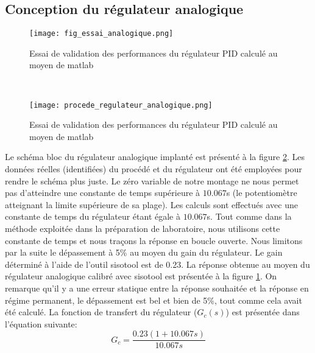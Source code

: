 \subsection{Conception du régulateur  analogique}
\begin{figure}[htb]
\centering
\texttt{[image: fig\_essai\_analogique.png]}
\caption{Essai de validation des performances du régulateur PID calculé au moyen de matlab}
\label{fig8}
\end{figure}\
\begin{figure}[htb]
\centering
\texttt{[image: procede\_regulateur\_analogique.png]}
\caption{Essai de validation des performances du régulateur PID calculé au moyen de matlab}
\label{fig9}
\end{figure}
Le schéma bloc du régulateur analogique implanté est présenté à la figure \ref{fig9}. Les données réelles (identifiées) du procédé et du régulateur ont été employées pour rendre le schéma plus juste. Le zéro variable de notre montage ne nous permet pas d'atteindre une constante de temps supérieure à $10.067$s (le potentiomètre atteignant la limite supérieure de sa plage). Les calculs sont effectués avec une constante de temps du régulateur étant égale à $10.067$s. Tout comme dans la méthode exploitée dans la préparation de laboratoire, nous utilisons cette constante de temps et nous traçons la réponse en boucle ouverte. Nous limitons par la suite le dépassement à 5\% au moyen du gain du régulateur. Le gain déterminé à l'aide de l'outil sisotool est de 0.23. La réponse obtenue au moyen du régulateur analogique calibré avec sisotool est présentée à la figure \ref{fig8}. On remarque qu'il y a une erreur statique entre la réponse souhaitée et la réponse en régime permanent, le dépassement est bel et bien de 5\%, tout comme cela avait été calculé.  La fonction de transfert du régulateur ($G_c(s)$) est présentée dans l'équation suivante:
\begin{equation}
G_c = \frac{0.23(1 + 10.067s)}{10.067s}
\end{equation}
